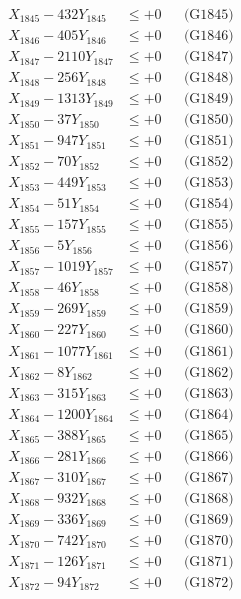 \documentclass[a4paper,10pt]{article}
\begin{document}
{\begin{align}
X_{1845} - 432Y_{1845} &\leq +0 && \text{(G1845)} \\
X_{1846} - 405Y_{1846} &\leq +0 && \text{(G1846)} \\
X_{1847} - 2110Y_{1847} &\leq +0 && \text{(G1847)} \\
X_{1848} - 256Y_{1848} &\leq +0 && \text{(G1848)} \\
X_{1849} - 1313Y_{1849} &\leq +0 && \text{(G1849)} \\
X_{1850} - 37Y_{1850} &\leq +0 && \text{(G1850)} \\
\allowbreak
X_{1851} - 947Y_{1851} &\leq +0 && \text{(G1851)} \\
X_{1852} - 70Y_{1852} &\leq +0 && \text{(G1852)} \\
X_{1853} - 449Y_{1853} &\leq +0 && \text{(G1853)} \\
X_{1854} - 51Y_{1854} &\leq +0 && \text{(G1854)} \\
X_{1855} - 157Y_{1855} &\leq +0 && \text{(G1855)} \\
X_{1856} - 5Y_{1856} &\leq +0 && \text{(G1856)} \\
X_{1857} - 1019Y_{1857} &\leq +0 && \text{(G1857)} \\
X_{1858} - 46Y_{1858} &\leq +0 && \text{(G1858)} \\
X_{1859} - 269Y_{1859} &\leq +0 && \text{(G1859)} \\
X_{1860} - 227Y_{1860} &\leq +0 && \text{(G1860)} \\
\allowbreak
X_{1861} - 1077Y_{1861} &\leq +0 && \text{(G1861)} \\
X_{1862} - 8Y_{1862} &\leq +0 && \text{(G1862)} \\
X_{1863} - 315Y_{1863} &\leq +0 && \text{(G1863)} \\
X_{1864} - 1200Y_{1864} &\leq +0 && \text{(G1864)} \\
X_{1865} - 388Y_{1865} &\leq +0 && \text{(G1865)} \\
X_{1866} - 281Y_{1866} &\leq +0 && \text{(G1866)} \\
X_{1867} - 310Y_{1867} &\leq +0 && \text{(G1867)} \\
X_{1868} - 932Y_{1868} &\leq +0 && \text{(G1868)} \\
X_{1869} - 336Y_{1869} &\leq +0 && \text{(G1869)} \\
X_{1870} - 742Y_{1870} &\leq +0 && \text{(G1870)} \\
\allowbreak
X_{1871} - 126Y_{1871} &\leq +0 && \text{(G1871)} \\
X_{1872} - 94Y_{1872} &\leq +0 && \text{(G1872)} \\

\end{align}}
\end{document}
